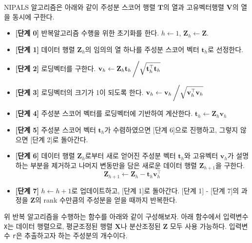 \documentclass[]{book}
\providecommand{\tightlist}{%
  \setlength{\itemsep}{0pt}\setlength{\parskip}{0pt}}
\begin{document}
NIPALS 알고리즘은 아래와 같이 주성분 스코어 행렬 \(\mathbf{T}\)의 열과 고유벡터행렬 \(\mathbf{V}\)의 열을 동시에 구한다.

\begin{itemize}
\tightlist
\item
  \textbf{{[}단계 0{]}} 반복알고리즘 수행을 위한 초기화를 한다. \(h \leftarrow 1\), \(\mathbf{Z}_h \leftarrow \mathbf{Z}\).
\item
  \textbf{{[}단계 1{]}} 데이터 행렬 \(\mathbf{Z}_h\)의 임의의 열 하나를 주성분 스코어 벡터 \(\mathbf{t}_h\)로 선정한다.
\item
  \textbf{{[}단계 2{]}} 로딩벡터를 구한다. \(\mathbf{v}_h \leftarrow \mathbf{Z}_h \mathbf{t}_h \left/ \sqrt{\mathbf{t}_h^\top \mathbf{t}_h} \right.\)
\item
  \textbf{{[}단계 3{]}} 로딩벡터의 크기가 1이 되도록 한다. \(\mathbf{v}_h \leftarrow \mathbf{v}_h \left/ \sqrt{\mathbf{v}_h^\top \mathbf{v}_h} \right.\)
\item
  \textbf{{[}단계 4{]}} 주성분 스코어 벡터를 로딩벡터에 기반하여 계산한다. \(\mathbf{t}_h \leftarrow \mathbf{Z}_h \mathbf{v}_h\)
\item
  \textbf{{[}단계 5{]}} 주성분 스코어 벡터 \(\mathbf{t}_h\)가 수렴하였으면 {[}단계 6{]}으로 진행하고, 그렇지 않으면 {[}단계 2{]}로 돌아간다.
\item
  \textbf{{[}단계 6{]}} 데이터 행렬 \(\mathbf{Z}_h\)로부터 새로 얻어진 주성분 벡터 \(\mathbf{t}_h\)와 고유벡터 \(\mathbf{v}_h\)가 설명하는 부분을 제거하고 나머지 변동만을 담은 새로운 데이터 행렬 \(\mathbf{Z}_{h + 1}\)을 구한다.
  \[ \mathbf{Z}_{h + 1} \leftarrow \mathbf{Z}_{h} - \mathbf{t}_h \mathbf{v}_h^\top \]
\item
  \textbf{{[}단계 7{]}} \(h \leftarrow h + 1\)로 업데이트하고, {[}단계 1{]}로 돌아간다. {[}단계 1{]} - {[}단계 7{]}의 과정을 \(\mathbf{Z}\)의 rank 수만큼의 주성분을 얻을 때까지 반복한다.
\end{itemize}

위 반복 알고리즘을 수행하는 함수를 아래와 같이 구성해보자. 아래 함수에서 입력변수 \texttt{X}는 데이터 행렬으로, 평균조정된 행렬 \(\mathbf{X}\)나 분산조정된 \(\mathbf{Z}\) 모두 사용 가능하다. 입력변수 \texttt{r}은 추출하고자 하는 주성분의 개수이다.
\end{document}
